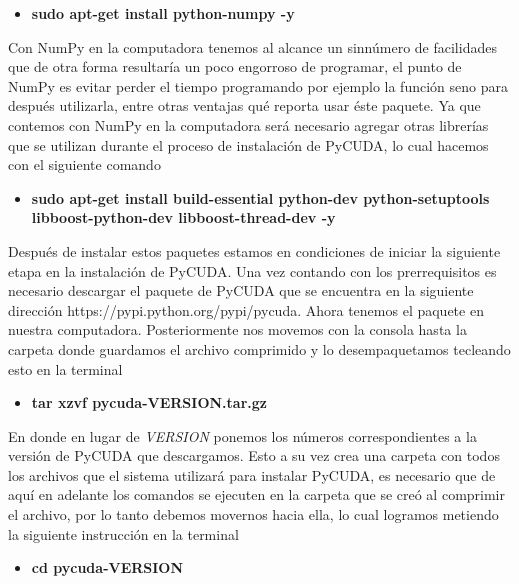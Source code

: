 \documentclass{article}
\begin{document}
\begin{itemize}
\itemsep1pt\parskip0pt
\item
  \textbf{sudo apt-get install python-numpy -y}
\end{itemize}

Con NumPy en la computadora tenemos al alcance un sinnúmero de
facilidades que de otra forma resultaría un poco engorroso de programar,
el punto de NumPy es evitar perder el tiempo programando por ejemplo la
función seno para después utilizarla, entre otras ventajas qué reporta
usar éste paquete. Ya que contemos con NumPy en la computadora será
necesario agregar otras librerías que se utilizan durante el proceso de
instalación de PyCUDA, lo cual hacemos con el siguiente comando

\begin{itemize}
\itemsep1pt\parskip0pt
\item
  \textbf{sudo apt-get install build-essential python-dev
  python-setuptools libboost-python-dev libboost-thread-dev -y}
\end{itemize}

Después de instalar estos paquetes estamos en condiciones de iniciar la
siguiente etapa en la instalación de PyCUDA. Una vez contando con los
prerrequisitos es necesario descargar el paquete de PyCUDA que se
encuentra en la siguiente dirección https://pypi.python.org/pypi/pycuda.
Ahora tenemos el paquete en nuestra computadora. Posteriormente nos
movemos con la consola hasta la carpeta donde guardamos el archivo
comprimido y lo desempaquetamos tecleando esto en la terminal

\begin{itemize}
\itemsep1pt\parskip0pt
\item
  \textbf{tar xzvf pycuda-VERSION.tar.gz}
\end{itemize}

En donde en lugar de \emph{VERSION} ponemos los números correspondientes
a la versión de PyCUDA que descargamos. Esto a su vez crea una carpeta
con todos los archivos que el sistema utilizará para instalar PyCUDA, es
necesario que de aquí en adelante los comandos se ejecuten en la carpeta
que se creó al comprimir el archivo, por lo tanto debemos movernos hacia
ella, lo cual logramos metiendo la siguiente instrucción en la terminal

\begin{itemize}
\itemsep1pt\parskip0pt
\item
  \textbf{cd pycuda-VERSION}
\end{itemize}
\end{document}
